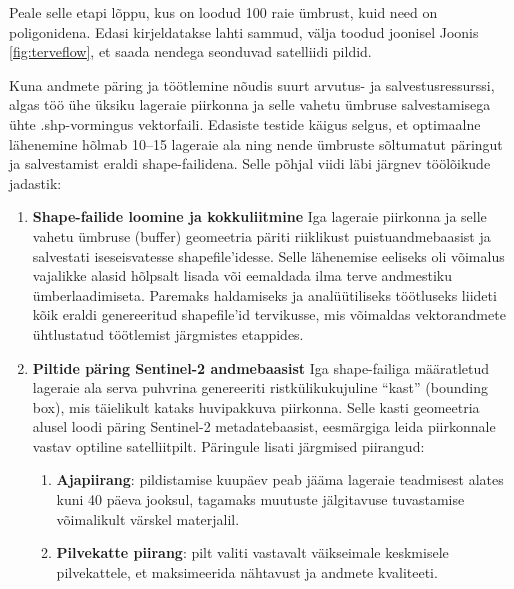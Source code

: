 Peale selle etapi lõppu, kus on loodud 100 raie ümbrust, kuid need on poligonidena. Edasi kirjeldatakse lahti sammud, välja toodud joonisel Joonis \ref{fig:terveflow}, et saada nendega seonduvad satelliidi pildid.

Kuna andmete päring ja töötlemine nõudis suurt arvutus- ja salvestusressurssi,
algas töö ühe üksiku lageraie piirkonna ja selle vahetu ümbruse salvestamisega
ühte .shp-vormingus vektorfaili. Edasiste testide käigus selgus, et optimaalne
lähenemine hõlmab 10--15 lageraie ala ning nende ümbruste sõltumatut päringut ja
salvestamist eraldi shape-failidena. Selle põhjal viidi läbi järgnev töölõikude
jadastik:
\begin{enumerate}[topsep=1pt,itemsep=1ex,partopsep=1ex,parsep=1ex]

\item \textbf{Shape-failide loomine ja kokkuliitmine}\newline
Iga lageraie piirkonna ja selle vahetu
ümbruse (buffer) geomeetria päriti riiklikust puistuandmebaasist ja salvestati
iseseisvatesse shapefile'idesse. Selle lähenemise eeliseks oli võimalus
vajalikke alasid hõlpsalt lisada või eemaldada ilma terve andmestiku
ümberlaadimiseta. Paremaks haldamiseks ja analüütiliseks töötluseks liideti kõik
eraldi genereeritud shapefile'id  tervikusse, mis võimaldas
vektorandmete ühtlustatud töötlemist järgmistes etappides.

\item \textbf{Piltide päring Sentinel-2 andmebaasist} \newline
Iga shape-failiga määratletud lageraie
ala serva puhvrina genereeriti ristkülikukujuline ``kast'' (bounding box), mis
täielikult kataks huvipakkuva piirkonna. Selle kasti geomeetria alusel loodi
päring Sentinel-2 metadatebaasist, eesmärgiga leida piirkonnale vastav optiline
satelliitpilt. Päringule lisati järgmised piirangud:

\begin{enumerate}

\item \textbf{Ajapiirang}: pildistamise kuupäev peab jääma lageraie teadmisest alates kuni 40
päeva jooksul, tagamaks muutuste jälgitavuse tuvastamise võimalikult värskel
materjalil.

\item \textbf{Pilvekatte piirang}: pilt valiti vastavalt väikseimale keskmisele pilvekattele,
et maksimeerida nähtavust ja andmete kvaliteeti.
\end{enumerate}


\end{enumerate}
